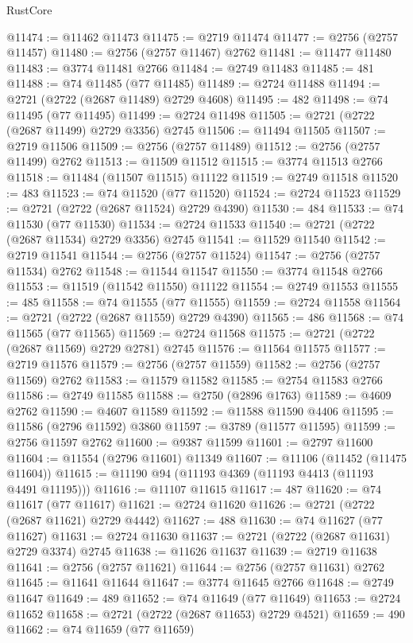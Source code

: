 \begin{lexlean}{RustCore}
\begin{coremodule}
@11474 := @11462 @11473
@11475 := @2719 @11474
@11477 := @2756 (@2757 @11457)
@11480 := @2756 (@2757 @11467) @2762
@11481 := @11477 @11480
@11483 := @3774 @11481 @2766
@11484 := @2749 @11483
@11485 := 481
@11488 := @74 @11485 (@77 @11485)
@11489 := @2724 @11488
@11494 := @2721 (@2722 (@2687 @11489) @2729 @4608)
@11495 := 482
@11498 := @74 @11495 (@77 @11495)
@11499 := @2724 @11498
@11505 := @2721 (@2722 (@2687 @11499) @2729 @3356) @2745
@11506 := @11494 @11505
@11507 := @2719 @11506
@11509 := @2756 (@2757 @11489)
@11512 := @2756 (@2757 @11499) @2762
@11513 := @11509 @11512
@11515 := @3774 @11513 @2766
@11518 := @11484 (@11507 @11515) @11122
@11519 := @2749 @11518
@11520 := 483
@11523 := @74 @11520 (@77 @11520)
@11524 := @2724 @11523
@11529 := @2721 (@2722 (@2687 @11524) @2729 @4390)
@11530 := 484
@11533 := @74 @11530 (@77 @11530)
@11534 := @2724 @11533
@11540 := @2721 (@2722 (@2687 @11534) @2729 @3356) @2745
@11541 := @11529 @11540
@11542 := @2719 @11541
@11544 := @2756 (@2757 @11524)
@11547 := @2756 (@2757 @11534) @2762
@11548 := @11544 @11547
@11550 := @3774 @11548 @2766
@11553 := @11519 (@11542 @11550) @11122
@11554 := @2749 @11553
@11555 := 485
@11558 := @74 @11555 (@77 @11555)
@11559 := @2724 @11558
@11564 := @2721 (@2722 (@2687 @11559) @2729 @4390)
@11565 := 486
@11568 := @74 @11565 (@77 @11565)
@11569 := @2724 @11568
@11575 := @2721 (@2722 (@2687 @11569) @2729 @2781) @2745
@11576 := @11564 @11575
@11577 := @2719 @11576
@11579 := @2756 (@2757 @11559)
@11582 := @2756 (@2757 @11569) @2762
@11583 := @11579 @11582
@11585 := @2754 @11583 @2766
@11586 := @2749 @11585
@11588 := @2750 (@2896 @1763)
@11589 := @4609 @2762
@11590 := @4607 @11589
@11592 := @11588 @11590 @4406
@11595 := @11586 (@2796 @11592) @3860
@11597 := @3789 (@11577 @11595)
@11599 := @2756 @11597 @2762
@11600 := @9387 @11599
@11601 := @2797 @11600
@11604 := @11554 (@2796 @11601) @11349
@11607 := @11106 (@11452 (@11475 @11604))
@11615 := @11190 @94 (@11193 @4369 (@11193 @4413 (@11193 @4491 @11195)))
@11616 := @11107 @11615
@11617 := 487
@11620 := @74 @11617 (@77 @11617)
@11621 := @2724 @11620
@11626 := @2721 (@2722 (@2687 @11621) @2729 @4442)
@11627 := 488
@11630 := @74 @11627 (@77 @11627)
@11631 := @2724 @11630
@11637 := @2721 (@2722 (@2687 @11631) @2729 @3374) @2745
@11638 := @11626 @11637
@11639 := @2719 @11638
@11641 := @2756 (@2757 @11621)
@11644 := @2756 (@2757 @11631) @2762
@11645 := @11641 @11644
@11647 := @3774 @11645 @2766
@11648 := @2749 @11647
@11649 := 489
@11652 := @74 @11649 (@77 @11649)
@11653 := @2724 @11652
@11658 := @2721 (@2722 (@2687 @11653) @2729 @4521)
@11659 := 490
@11662 := @74 @11659 (@77 @11659)

\end{coremodule}
\end{lexlean}
